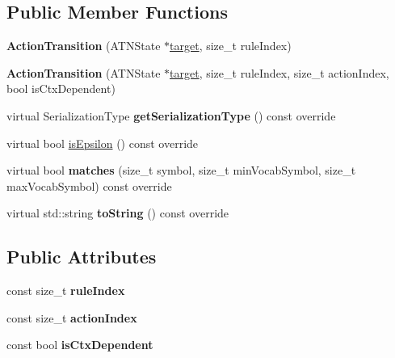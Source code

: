 \subsection*{Public Member Functions}
\begin{DoxyCompactItemize}
\item 
\mbox{\label{classantlr4_1_1atn_1_1ActionTransition_a2771f493d91a6537b4edd0be5ead778f}} 
{\bfseries Action\+Transition} (A\+T\+N\+State $\ast$\hyperlink{classantlr4_1_1atn_1_1Transition_aaaed7f4ddda71e156b36de33e88f66a7}{target}, size\+\_\+t rule\+Index)
\item 
\mbox{\label{classantlr4_1_1atn_1_1ActionTransition_a9db50574aa1160b0286d5677f2bf76a4}} 
{\bfseries Action\+Transition} (A\+T\+N\+State $\ast$\hyperlink{classantlr4_1_1atn_1_1Transition_aaaed7f4ddda71e156b36de33e88f66a7}{target}, size\+\_\+t rule\+Index, size\+\_\+t action\+Index, bool is\+Ctx\+Dependent)
\item 
\mbox{\label{classantlr4_1_1atn_1_1ActionTransition_a25ce773af6ba3e4c0a582bf92f1f762d}} 
virtual Serialization\+Type {\bfseries get\+Serialization\+Type} () const override
\item 
virtual bool \hyperlink{classantlr4_1_1atn_1_1ActionTransition_a995b2814e1d1751f39655f6856572584}{is\+Epsilon} () const override
\item 
\mbox{\label{classantlr4_1_1atn_1_1ActionTransition_a4f37aaaacdfa869ed9fc2bfd18c4c4f1}} 
virtual bool {\bfseries matches} (size\+\_\+t symbol, size\+\_\+t min\+Vocab\+Symbol, size\+\_\+t max\+Vocab\+Symbol) const override
\item 
\mbox{\label{classantlr4_1_1atn_1_1ActionTransition_ac6073b34445e5c7e8725801bb2f08fac}} 
virtual std\+::string {\bfseries to\+String} () const override
\end{DoxyCompactItemize}
\subsection*{Public Attributes}
\begin{DoxyCompactItemize}
\item 
\mbox{\label{classantlr4_1_1atn_1_1ActionTransition_a7da8a981b5daec5c8071a653c5a36fc9}} 
const size\+\_\+t {\bfseries rule\+Index}
\item 
\mbox{\label{classantlr4_1_1atn_1_1ActionTransition_a905ea817ee87fee14169bfa474342b60}} 
const size\+\_\+t {\bfseries action\+Index}
\item 
\mbox{\label{classantlr4_1_1atn_1_1ActionTransition_aba0631ffdeba1c944dfd22cd3a5b68b4}} 
const bool {\bfseries is\+Ctx\+Dependent}
\end{DoxyCompactItemize}
